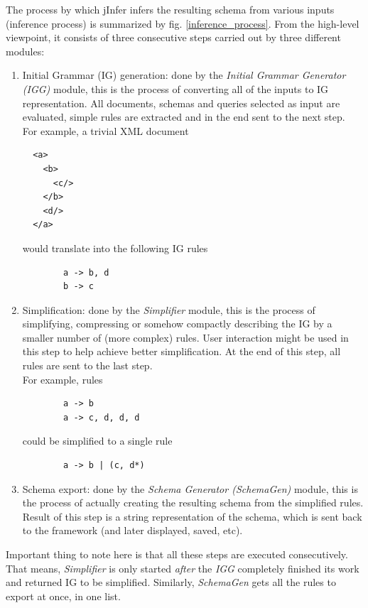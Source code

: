 \documentclass[a4paper,10pt,oneside]{article}
\begin{document}
The process by which jInfer infers the resulting schema from various inputs (inference process) is summarized by fig. \ref{inference_process}. From the high-level viewpoint, it consists of three consecutive steps carried out by three different modules:
\begin{enumerate}
	\item Initial Grammar (IG) generation: done by the \textit{Initial Grammar Generator (IGG)} module, this is the process of converting all of the inputs to IG representation. All documents, schemas and queries selected as input are evaluated, simple rules are extracted and in the end sent to the next step.\\
	For example, a trivial XML document
	\begin{verbatim}
  <a>
    <b>
      <c/>
    </b>
    <d/>
  </a>
	\end{verbatim}
	would translate into the following IG rules
	\begin{verbatim}
		a -> b, d
		b -> c
	\end{verbatim}	
	\item Simplification: done by the \textit{Simplifier} module, this is the process of simplifying, compressing or somehow compactly describing the IG by a smaller number of (more complex) rules. User interaction might be used in this step to help achieve better simplification. At the end of this step, all rules are sent to the last step.\\
	For example, rules
	\begin{verbatim}
		a -> b
		a -> c, d, d, d
	\end{verbatim}
	could be simplified to a single rule
	\begin{verbatim}
		a -> b | (c, d*)
	\end{verbatim}
	\item Schema export: done by the \textit{Schema Generator (SchemaGen)} module, this is the process of actually creating the resulting schema from the simplified rules. Result of this step is a string representation of the schema, which is sent back to the framework (and later displayed, saved, etc).\\
\end{enumerate}
Important thing to note here is that all these steps are executed consecutively. That means, \textit{Simplifier} is only started \textit{after} the \textit{IGG} completely finished its work and returned IG to be simplified. Similarly, \textit{SchemaGen} gets all the rules to export at once, in one list.\\
\end{document}
